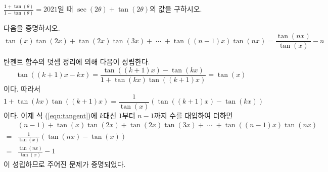 \documentclass[11pt, a4paper]{book}
\begin{document}
\vspace{1em}
\begin{problem}
	$\frac{1+\tan(\theta)}{1-\tan(\theta)}=2021$일 때 $\sec(2\theta)+\tan(2\theta)$의 값을 구하시오.
\end{problem}
\vspace{1em}
\begin{example}\label{exam:telescoping}
	다음을 증명하시오.
	\begin{equation*}
		\tan(x)\tan(2x) +\tan(2x)\tan(3x) + \;\cdots \; + \tan((n-1)x) \tan(nx) =\frac{\tan(nx)}{\tan(x)} -n
	\end{equation*}
\begin{solution}
	탄젠트 함수의 덧셈 정리에 의해 다음이 성립한다.
	\begin{equation*}
		\tan\left((k+1)x - kx \right) =\frac{\tan((k+1)x)-\tan(kx)}{1+\tan(kx)\tan((k+1)x)} =\tan(x)
	\end{equation*}
이다. 따라서
\begin{equation}\label{eqn:tangent}
	1+\tan(kx) \tan((k+1)x) =\frac{1}{\tan(x)} \left(\tan((k+1)x) -\tan(kx)\right)
\end{equation}
이다. 이제 식 (\ref{eqn:tangent})에 $k$대신 $1$부터 $n-1$까지 수를 대입하여 더하면
\begin{align*}
	\phantom{=}&(n-1)+\tan(x)\tan(2x) +\tan(2x)\tan(3x) + \;\cdots \; + \tan((n-1)x) \tan(nx)\\
	=&\frac{1}{\tan(x)}\left(\tan(nx)-\tan(x)\right)\\
	=&\frac{\tan(nx)}{\tan(x)} -1 
\end{align*}
이 성립하므로 주어진 문제가 증명되었다.
\end{solution}
\end{example}
\end{document}
